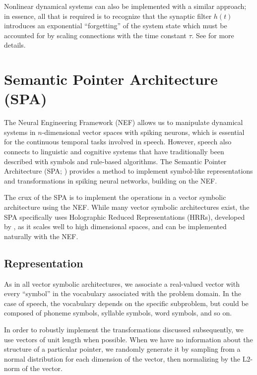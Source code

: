 Nonlinear dynamical systems can also be implemented
with a similar approach;
in essence, all that is required is to
recognize that the synaptic filter $h(t)$
introduces an exponential ``forgetting''
of the system state
which must be accounted for by scaling
connections with the time constant $\tau$.
See \citet{eliasmith2004,eliasmith2013}
for more details.

\section{Semantic Pointer Architecture (SPA)}
\label{sec:methods-spa}

The Neural Engineering Framework (NEF)
allows us to manipulate dynamical systems
in $n$-dimensional vector spaces
with spiking neurons,
which is essential for
the continuous temporal tasks
involved in speech.
However, speech also connects
to linguistic and cognitive systems
that have traditionally been described
with symbols
and rule-based algorithms.
The Semantic Pointer Architecture (SPA; \citealp{eliasmith2013})
provides a method to implement
symbol-like representations
and transformations in spiking neural networks,
building on the NEF.

The crux of the SPA is to implement
the operations in
a vector symbolic architecture
using the NEF.
While many vector symbolic architectures exist,
the SPA specifically uses
Holographic Reduced Representations (HRRs),
developed by \citet{plate1994},
as it scales well to high dimensional spaces,
and can be implemented naturally
with the NEF.

\subsection{Representation}

As in all vector symbolic architectures,
we associate a real-valued vector
with every ``symbol''
in the vocabulary associated with
the problem domain.
In the case of speech,
the vocabulary depends on
the specific subproblem,
but could be composed
of phoneme symbols,
syllable symbols,
word symbols, and so on.

In order to robustly implement
the transformations discussed
subsequently,
we use vectors of unit length
when possible.
When we have no information
about the structure of a particular pointer,
we randomly generate it
by sampling from a normal distribution
for each dimension of the vector,
then normalizing by the L2-norm
of the vector.

